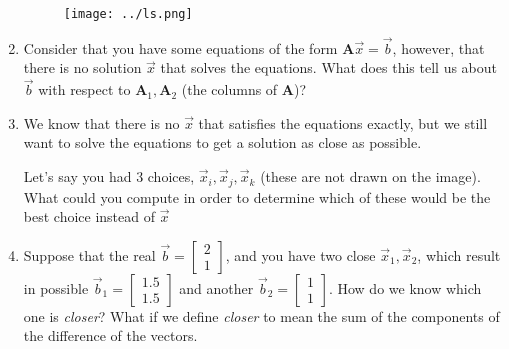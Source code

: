 \begin{enumerate}

\begin{figure}[H]
    \centering
    \texttt{[image: ../ls.png]}
\end{figure}

\item{

Consider that you have some equations of the form $\mathbf{A}\vec{x} = \vec{b}$, however, that there is no solution $\vec{x}$ that solves the equations. What does this tell us about $\vec{b}$ with respect to $\mathbf{A}_1, \mathbf{A}_2$ (the columns of $\mathbf{A}$)?
}


\item{
We know that there is no $\vec{x}$ that satisfies the equations exactly, but we still want to solve the equations to get a solution as close as possible.

Let's say you had 3 choices, $\vec{x}_i, \vec{x}_j, \vec{x}_k$ (these are not drawn on the image). What could you compute in order to determine which of these would be the best choice instead of $\vec{x}$
}



\item{Suppose that the real $\vec{b} = \begin{bmatrix} 2 \\ 1 \end{bmatrix}$, and you have two close $\vec{x}_1, \vec{x}_2$, which result in possible $\vec{b}_1 = \begin{bmatrix} 1.5 \\ 1.5 \end{bmatrix}$ and another $\vec{b}_2 = \begin{bmatrix} 1 \\ 1 \end{bmatrix}$. How do we know which one is \textit{closer}? What if we define \textit{closer} to mean the sum of the components of the difference of the vectors.}


\end{enumerate}
